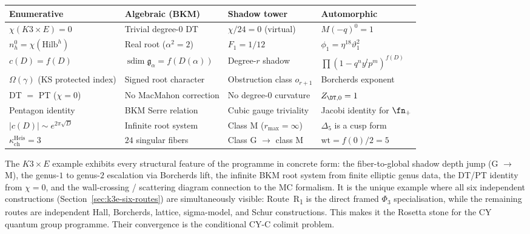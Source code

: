 \begin{center}
\renewcommand{\arraystretch}{1.3}
\begin{tabular}{@{}llll@{}}
\textbf{Enumerative} & \textbf{Algebraic (BKM)} & \textbf{Shadow tower} & \textbf{Automorphic} \\ \hline
$\chi(K3 \times E) = 0$ & Trivial degree-$0$ DT & $\chi/24 = 0$ (virtual) & $M(-q)^0 = 1$ \\
$n_h^0 = \chi(\mathrm{Hilb}^h)$ & Real root ($\alpha^2 = 2$) & $F_1 = 1/12$ & $\phi_1 = \eta^{18}\vartheta_1^2$ \\
$c(D) = f(D)$ & $\operatorname{sdim}\mathfrak g_\alpha = f(D(\alpha))$ & Degree-$r$ shadow & $\prod (1 - q^ny^lp^m)^{f(D)}$ \\
$\Omega(\gamma)$ (KS protected index) & Signed root character & Obstruction class $o_{r+1}$ & Borcherds exponent \\
DT $=$ PT ($\chi = 0$) & No MacMahon correction & No degree-$0$ curvature & $Z_{\DT,0} = 1$ \\
Pentagon identity & BKM Serre relation & Cubic gauge triviality & Jacobi identity for $\fn_+$ \\
$|c(D)| \sim e^{2\pi\sqrt{D}}$ & Infinite root system & Class M ($r_{\max} = \infty$) & $\Delta_5$ is a cusp form \\
$\kappa_{\mathrm{ch}}^{\mathrm{Heis}} = 3$ & $24$ singular fibers & Class G $\to$ class M & $\mathrm{wt} = f(0)/2 = 5$
\end{tabular}
\end{center}

\begin{remark}
\label{rem:k3e-paradigm}
The $K3 \times E$ example exhibits every structural feature of the programme in concrete form: the fiber-to-global shadow depth jump (G $\to$ M), the genus-$1$ to genus-$2$ escalation via Borcherds lift, the infinite BKM root system from finite elliptic genus data, the DT/PT identity from $\chi = 0$, and the wall-crossing / scattering diagram connection to the MC formalism. It is the unique example where all six independent constructions (Section~\ref{sec:k3e-six-routes}) are simultaneously visible: Route~R\textsubscript{1} is the direct framed $\Phi_3$ specialisation, while the remaining routes are independent Hall, Borcherds, lattice, sigma-model, and Schur constructions. This makes it the Rosetta stone for the CY quantum group programme. Their convergence is the conditional CY-C colimit problem.
\end{remark}

